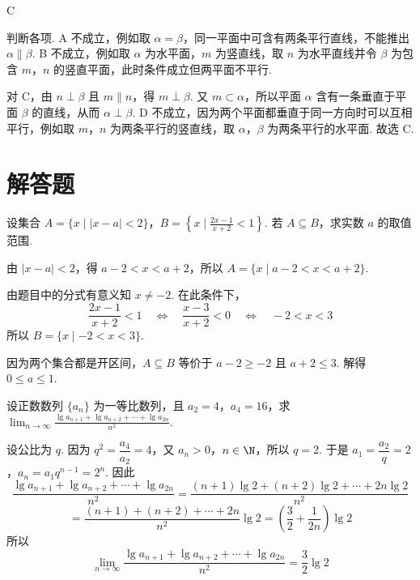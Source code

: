 \documentclass[UTF8,a4paper,oneside,11pt]{ctexbook}
\begin{document}
\begin{answer}
C
\end{answer}

\begin{solution}
判断各项. A 不成立，例如取 \(\alpha=\beta\)，同一平面中可含有两条平行直线，不能推出 \(\alpha\parallel\beta\). B 不成立，例如取 \(\alpha\) 为水平面，\(m\) 为竖直线，取 \(n\) 为水平直线并令 \(\beta\) 为包含 \(m\)，\(n\) 的竖直平面，此时条件成立但两平面不平行.

对 C，由 \(n\perp\beta\) 且 \(m\parallel n\)，得 \(m\perp\beta\). 又 \(m\subset\alpha\)，所以平面 \(\alpha\) 含有一条垂直于平面 \(\beta\) 的直线，从而 \(\alpha\perp\beta\). D 不成立，因为两个平面都垂直于同一方向时可以互相平行，例如取 \(m\)，\(n\) 为两条平行的竖直线，取 \(\alpha\)，\(\beta\) 为两条平行的水平面. 故选 C.
\end{solution}

\section{解答题}

\begin{problem}
设集合 \(A = \{x \mid |x - a| < 2\}\)，\(B = \left\{ x \mid \frac{2x - 1}{x + 2} < 1 \right\}\). 若 \(A \subseteq B\)，求实数 \(a\) 的取值范围.
\end{problem}

\begin{solution}
由 \(|x-a|<2\)，得 \(a-2<x<a+2\)，所以 \(A=\{x\mid a-2<x<a+2\}\).

由题目中的分式有意义知 \(x\ne-2\). 在此条件下，
\[
\frac{2x-1}{x+2}<1\quad\Longleftrightarrow\quad\frac{x-3}{x+2}<0\quad\Longleftrightarrow\quad -2<x<3
\]
所以 \(B=\{x\mid -2<x<3\}\).

因为两个集合都是开区间，\(A\subseteq B\) 等价于 \(a-2\ge-2\) 且 \(a+2\le3\). 解得 \(0\le a\le1\).
\end{solution}

\begin{problem}
设正数数列 \(\{a_n\}\) 为一等比数列，且 \(a_2 = 4\)，\(a_4 = 16\)，求 \(\displaystyle\lim_{n \to \infty} \frac{\lg a_{n + 1} + \lg a_{n + 2} + \cdots + \lg a_{2n}}{n^2}\).
\end{problem}

\begin{solution}
设公比为 \(q\). 因为 \(q^2=\dfrac{a_4}{a_2}=4\)，又 \(a_n>0\)，\(n\in\N\)，所以 \(q=2\). 于是 \(a_1=\dfrac{a_2}{q}=2\)，\(a_n=a_1q^{n-1}=2^n\).
因此
\[
\frac{\lg a_{n+1}+\lg a_{n+2}+\cdots+\lg a_{2n}}{n^2}
=\frac{(n+1)\lg2+(n+2)\lg2+\cdots+2n\lg2}{n^2}
\]
\[
=\frac{(n+1)+(n+2)+\cdots+2n}{n^2}\lg2
=\left(\frac32+\frac{1}{2n}\right)\lg2
\]
所以
\[
\lim_{n\to\infty}\frac{\lg a_{n+1}+\lg a_{n+2}+\cdots+\lg a_{2n}}{n^2}
=\frac32\lg2
\]
\end{solution}
\end{document}
